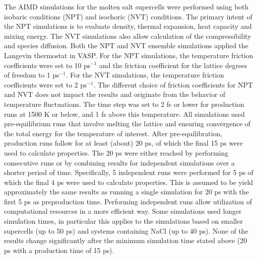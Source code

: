 \documentclass[preprint,3p,10pt,twocolumn,number,sort&compress]{elsarticle}
\begin{document}
The AIMD simulations for the molten salt supercells were performed using both isobaric conditions (NPT) and isochoric (NVT) conditions. The primary intent of the NPT simulations is to evaluate density, thermal expansion, heat capacity and mixing energy. The NVT simulations also allow calculation of the compressibility and species diffusion. Both the NPT and NVT ensemble simulations applied the Langevin thermostat in VASP.
For the NPT simulations, the temperature friction coefficients were set to 10 ps$^{-1}$ and the friction coefficient for the lattice degrees of freedom to 1 ps$^{-1}$. For the NVT simulations, the temperature friction coefficients were set to 2 ps$^{-1}$. The different  choice of friction coefficients for NPT and NVT does not impact the results and originate from the behavior of temperature fluctuations. The time step was set to 2 fs or lower for production runs at 1500 K or below, and 1 fs above this temperature. All simulations used pre-equilibrium runs that involve melting the lattice and ensuring convergence of the total energy for the temperature of interest. After pre-equilibration, production runs follow for at least (about) 20 ps, of which the final 15 ps were used to calculate properties. The 20 ps were either reached by performing consecutive runs or by combining results for independent simulations over a shorter period of time. Specifically, 5 independent runs were performed for 5 ps of which the final 4 ps were used to calculate properties. This is assumed to be yield approximately the same results as running a single simulation for 20 ps with the first 5 ps as preproduction time. Performing independent runs allow utilization of computational resources in a more efficient way. Some simulations used longer simulation times, in particular this applies to the simulations based on smaller supercells (up to 50 ps) and systems containing NaCl (up to 40 ps).  None of the results change significantly after the minimum simulation time stated above (20 ps with a production time of 15 ps).
\end{document}

